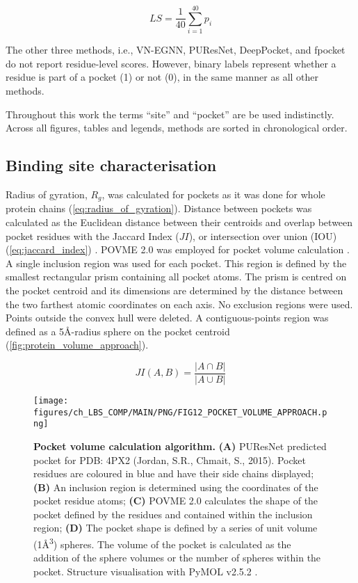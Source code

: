 \begin{equation}
LS = \frac{1}{40} \sum_{i=1}^{40} p_i
\label{eq:IFSP_score}
\end{equation}

The other three methods, i.e., VN-EGNN, PUResNet, DeepPocket, and fpocket do not report residue-level scores. However, binary labels represent whether a residue is part of a pocket (1) or not (0), in the same manner as all other methods.

Throughout this work the terms ``site'' and ``pocket'' are be used indistinctly. Across all figures, tables and legends, methods are sorted in chronological order.

\subsection{Binding site characterisation}

Radius of gyration, $R_{g}$, was calculated for pockets as it was done for whole protein chains (\autoref{eq:radius_of_gyration}). Distance between pockets was calculated as the Euclidean distance between their centroids and overlap between pocket residues with the Jaccard Index ($JI$), or intersection over union (IOU) (\autoref{eq:jaccard_index}) \cite{JACCARD_1901_INDEX, JACCARD_1912_INDEX}. POVME 2.0 was employed for pocket volume calculation \cite{DURRANT_2011_POVME, DURRANT_2014_POVME2, WAGNER_2017_POVME3}. A single inclusion region was used for each pocket. This region is defined by the smallest rectangular prism containing all pocket atoms. The prism is centred on the pocket centroid and its dimensions are determined by the distance between the two farthest atomic coordinates on each axis. No exclusion regions were used. Points outside the convex hull were deleted. A contiguous-points region was defined as a 5\AA{}-radius sphere on the pocket centroid (\autoref{fig:protein_volume_approach}).

\begin{equation}
JI(A, B) = \frac{|A \cap B|}{|A \cup B|}
\label{eq:jaccard_index}
\end{equation}

\begin{figure}[h]
    \centering
    \texttt{[image: figures/ch\_LBS\_COMP/MAIN/PNG/FIG12\_POCKET\_VOLUME\_APPROACH.png]}
    \caption[Pocket volume calculation algorithm]{\textbf{Pocket volume calculation algorithm.} \textbf{(A)} PUResNet predicted pocket for PDB: 4PX2 (Jordan, S.R., Chmait, S., 2015). Pocket residues are coloured in blue and have their side chains displayed; \textbf{(B)} An inclusion region is determined using the coordinates of the pocket residue atoms; \textbf{(C)} POVME 2.0 calculates the shape of the pocket defined by the residues and contained within the inclusion region; \textbf{(D)} The pocket shape is defined by a series of unit volume (1\AA{}\textsuperscript{3}) spheres. The volume of the pocket is calculated as the addition of the sphere volumes or the number of spheres within the pocket. Structure visualisation with PyMOL v2.5.2 \cite{SCHRODINGER_2015_PYMOL}.}
    \label{fig:protein_volume_approach}
\end{figure}

